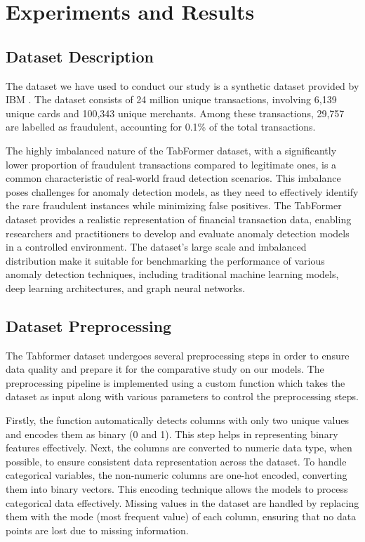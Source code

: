 \documentclass[pdflatex,sn-mathphys-num]{sn-jnl}%
\begin{document}
\section{Experiments and Results}\label{sec4}

\subsection{Dataset Description}\label{subsec4}

The dataset we have used to conduct our study is a synthetic dataset provided by IBM \cite{ibm2021}. The dataset consists of 24 million unique transactions, involving 6,139 unique cards and 100,343 unique merchants. Among these transactions, 29,757 are labelled as fraudulent, accounting for 0.1\% of the total transactions.

The highly imbalanced nature of the TabFormer dataset, with a significantly lower proportion of fraudulent transactions compared to legitimate ones, is a common characteristic of real-world fraud detection scenarios. This imbalance poses challenges for anomaly detection models, as they need to effectively identify the rare fraudulent instances while minimizing false positives.
The TabFormer dataset provides a realistic representation of financial transaction data, enabling researchers and practitioners to develop and evaluate anomaly detection models in a controlled environment. The dataset's large scale and imbalanced distribution make it suitable for benchmarking the performance of various anomaly detection techniques, including traditional machine learning models, deep learning architectures, and graph neural networks.

\subsection{Dataset Preprocessing}\label{subsec4}

The Tabformer dataset undergoes several preprocessing steps in order to ensure data quality and prepare it for the comparative study on our models. The preprocessing pipeline is implemented using a custom function which takes the dataset as input along with various parameters to control the preprocessing steps.

Firstly, the function automatically detects columns with only two unique values and encodes them as binary (0 and 1). This step helps in representing binary features effectively. Next, the columns are converted to numeric data type, when possible, to ensure consistent data representation across the dataset. To handle categorical variables, the non-numeric columns are one-hot encoded, converting them into binary vectors. This encoding technique allows the models to process categorical data effectively. Missing values in the dataset are handled by replacing them with the mode (most frequent value) of each column, ensuring that no data points are lost due to missing information.
\end{document}
